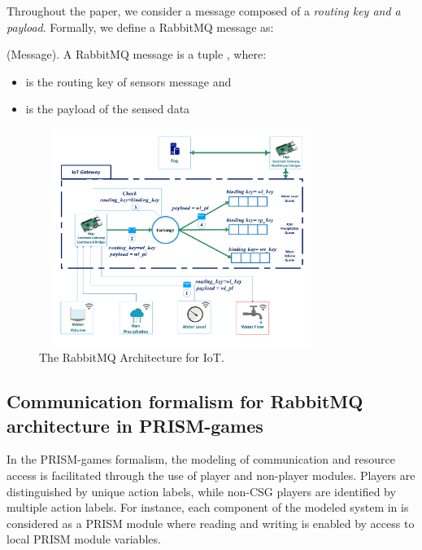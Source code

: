 Throughout the paper, we consider a message composed of a \emph{routing key and a payload}. Formally, we define a RabbitMQ message as:

\begin{mydef} \label{def:message} \normalfont (Message). A RabbitMQ message  is a tuple , where: 
 \begin{itemize}
\item {} is the routing key of sensors message and
\item {} is the payload of the sensed data
            \end{itemize}
\end{mydef}
\begin{figure}[!htb]
           
\noindent
     \centering

		\includegraphics[width=263pt, height =200pt]{ArchitectureRabbit.pdf}
		\caption{The RabbitMQ Architecture for IoT.}
	\label{fig:rabbitarchitecture}
\end{figure}

\subsection{Communication formalism for RabbitMQ architecture in PRISM-games}
In the PRISM-games formalism, the modeling of communication and resource access is facilitated through the use of player and non-player modules. Players are distinguished by unique action labels, while non-CSG players are identified by multiple action labels. For instance, each component of the modeled system in  is considered as a PRISM module where reading and writing is enabled by access to local PRISM module variables.


